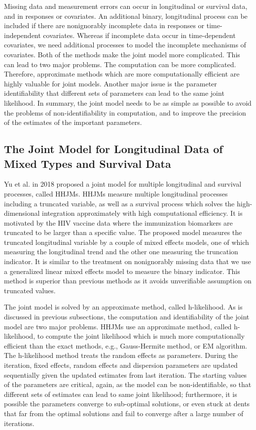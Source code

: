 Missing data and measurement errors can occur in longitudinal or survival data, and in responses or covariates.
An additional binary, longitudinal process can be included if there are nonignorably incomplete data in responses or time-independent covariates. Whereas if incomplete data occur in time-dependent covariates, we need additional processes to model the incomplete mechanisms of covariates. Both of the methods make the joint model more complicated. This can lead to two major problems. The computation can be more complicated. Therefore, approximate methods which are more computationally efficient are highly valuable for joint models. Another major issue is the parameter identifiability that different sets of parameters can lead to the same joint likelihood. In summary, the joint model needs to be as simple as possible to avoid the problems of non-identifiability in computation, and to improve the precision of the estimates of the important parameters.


\subsection{The Joint Model for Longitudinal Data of Mixed Types and Survival Data}


Yu et al. in 2018 \cite{yu2018joint} proposed a joint model for multiple longitudinal and survival processes, called HHJMs. HHJMs measure multiple longitudinal processes including a truncated variable, as well as a survival process which solves the high-dimensional integration approximately with high computational efficiency. It is motivated by the HIV vaccine data where the immunization biomarkers are truncated to be larger than a specific value. The proposed model measures the truncated longitudinal variable by a couple of mixed effects models, one of which measuring the longitudinal trend and the other one measuring the truncation indicator. It is similar to the treatment on nonignorably missing data that we use a generalized linear mixed effects model to measure the binary indicator. This method is superior than previous methods as it avoids unverifiable assumption on truncated values.


The joint model is solved by an approximate method, called h-likelihood.
As is discussed in previous subsections, the computation and identifiability of the joint model are two major problems. HHJMs use an approximate method, called h-likelihood, to compute the joint likelihood which is much more computationally efficient than the exact methods, e.g., Gauss-Hermite method, or EM algorithm. The h-likelihood method treats the random effects as parameters. During the iteration, fixed effects, random effects and dispersion parameters are updated sequentially given the updated estimates from last iteration. The starting values of the parameters are critical, again, as the model can be non-identifiable, so that different sets of estimates can lead to same joint likelihood; furthermore, it is possible the parameters converge to sub-optimal solutions, or even stuck at dents that far from the optimal solutions and fail to converge after a large number of iterations.


